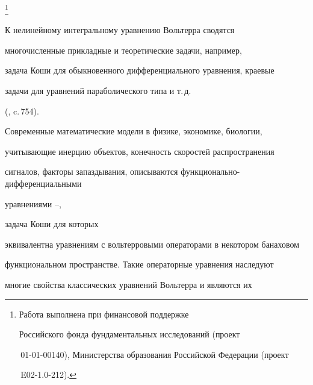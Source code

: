 \thanks{Работа выполнена при финансовой поддержке


Российского фонда фундаментальных исследований  (проект 


\No\,01-01-00140), Министерства образования Российской Федерации (проект


\No\,E02-1.0-212).}





\date{}




\pagestyle{plain} %







\maketitle


\label{begin}











К нелинейному интегральному уравнению Вольтерра сводятся


многочисленные прикладные и теоретические задачи, например,


задача Коши для обыкновенного дифференциального уравнения, краевые


задачи для уравнений параболического типа и т.\,д.


(\cite{Enciklopedia}, c.\,754).


Современные математические модели в физике, экономике, биологии,


учитывающие инерцию объектов, конечность скоростей распространения


сигналов, факторы запаздывания, описываются функционально-дифференциальными


уравнениями \cite{AzbMakRahFDU}--\cite{AzSim},


задача Коши для которых


эквивалентна уравнениям с вольтерровыми операторами в некотором банаховом


функциональном пространстве. Такие операторные уравнения наследуют


многие свойства классических уравнений Вольтерра и являются их


